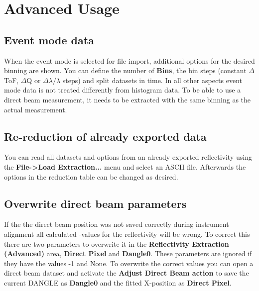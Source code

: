 \chapter{Advanced Usage}
\label{chap:advanced_usage}
  \section{Event mode data}
    When the event mode is selected for file import, additional options for the desired binning are shown. You can define the number of \textbf{Bins}, the bin steps (constant $\Delta$ToF, $\Delta$Q or $\Delta\lambda/\lambda$ steps) and split datasets in time.
    In all other aspects event mode data is not treated differently from histogram data. To be able to use a direct beam measurement, it needs to be extracted with the same binning as the actual measurement.
  
  \section{Re-reduction of already exported data}
    You can read all datasets and options from an already exported reflectivity using the \textbf{File->Load Extraction...} menu and select an ASCII file. 
    Afterwards the options in the reduction table can be changed as desired.

  \section{Overwrite direct beam parameters}
  \label{sec:overwrite}
    If the the direct beam position was not saved correctly during instrument alignment all calculated \Qz-values for the reflectivity will be wrong.
    To correct this there are two parameters to overwrite it in the \textbf{Reflectivity Extraction (Advanced)} area, \textbf{Direct Pixel} and \textbf{Dangle0}.
    These parameters are ignored if they have the values -1 and None.
    To overwrite the correct values you can open a direct beam dataset and activate the  \textbf{Adjust Direct Beam action}  to save the current DANGLE as \textbf{Dangle0} and the fitted X-position as \textbf{Direct Pixel}.
  
  \clearpage
